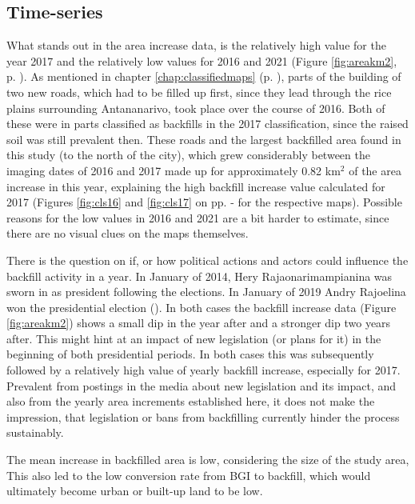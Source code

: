 \documentclass[11pt, A4, oneside]{report}
\begin{document}
\subsection{Time-series}
What stands out in the area increase data, is the relatively high value for the year 2017  and the relatively low values for 2016 and 2021 (Figure \ref{fig:areakm2}, p. \pageref{fig:areakm2}). As mentioned in chapter \ref{chap:classifiedmaps} (p. \pageref{chap:classifiedmaps}), parts of the building of two new roads, which had to be filled up first, since they lead through the rice plains surrounding Antananarivo,  took place over the course of 2016. Both of these were in parts classified as backfills in the 2017 classification, since the raised soil was still prevalent then. These roads and the largest backfilled area found in this study (to the north of the city), which grew considerably between the imaging dates of 2016 and 2017 made up for approximately 0.82 km$^2$ of the area increase in this year, explaining the high backfill increase value calculated for 2017 (Figures \ref{fig:cls16} and \ref{fig:cls17} on pp. \pageref{fig:cls16} - \pageref{fig:cls17} for the respective maps). Possible reasons for the low values in 2016 and 2021 are a bit harder to estimate, since there are no visual clues on the maps themselves. %

There is the question on if, or how political actions and actors could influence the backfill activity in a year. In January of 2014, Hery Rajaonarimampianina was sworn in as president following the elections.
In January of 2019 Andry Rajoelina won the presidential election (\cite{BBC.2018}). In both cases the backfill increase data (Figure \ref{fig:areakm2}) shows a small dip in the year after and a stronger dip two years after. This might hint at an impact of new legislation (or plans for it) in the beginning of both presidential periods. In both cases this was subsequently followed by a relatively high value of yearly backfill increase, especially for 2017. Prevalent from postings in the media about new legislation and its impact, and also from the yearly area increments established here, it does not make the impression, that legislation or bans from backfilling currently hinder the process sustainably.


%
The mean increase in backfilled area is low, considering the size of the study area, This also led to the low conversion rate from BGI to backfill, which would ultimately become urban or built-up land to be low. %
\end{document}
